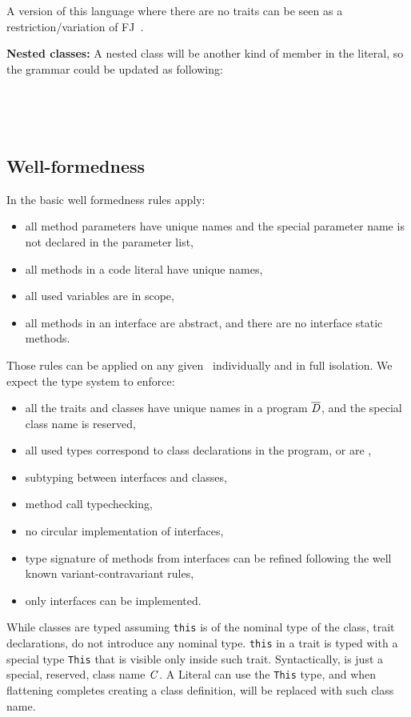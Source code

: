 A version of this language where there are no traits can be seen 
as a restriction/variation of FJ~\cite{igarashi2001featherweight}.

\noindent\textbf{Nested classes:}
A nested class will be another kind of member in the literal, so  
the grammar could be updated as following:

\begin{bnf}
\prodFull{}\\
\prodFull{}
\end{bnf}\\


\subsection{Well-formedness}
In \name the basic well formedness rules apply:
\begin{itemize}
\item all method parameters have unique names and the special parameter name \Q@this@ is not declared
 in the parameter list,
\item all methods in a code literal have unique names,
\item all used variables are in scope,
\item all methods in an interface are abstract, and there are no interface static methods.
\end{itemize}
Those rules can be applied on any given \mL~individually and in full isolation.
We expect the type system to enforce: 
\begin{itemize}
\item all the traits and classes have unique names in a program $\overline{\mathit{D}}$, and the special class name
\Q@This@ is reserved,
\item all used types correspond to class declarations in the program, or are \Q@This@, 
\item subtyping between interfaces and classes,
\item method call typechecking,
\item no circular implementation of interfaces,
\item type signature of methods from interfaces can be refined following the well known variant-contravariant rules,
\item only interfaces can be implemented.
\end{itemize}
While classes are typed assuming \lstinline{this} is of the nominal type of the
class, trait declarations, do not introduce any nominal type.  \lstinline{this}
in a trait is typed with a special type \lstinline{This} that is visible only
inside such trait. Syntactically, \Q@This@ is just a special, reserved, class name $\mathit{C}$.
A Literal can use the \lstinline{This} type,
and when flattening completes creating a class definition, \Q@This@ will be replaced with such class name.

